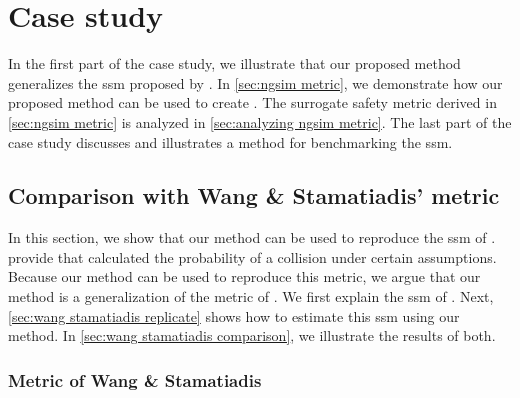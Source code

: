 \section{Case study}
\label{sec:case study}

In the first part of the case study, we illustrate that our proposed method generalizes the \ac{ssm} proposed by \textcite{wang2014evaluation}.
In \cref{sec:ngsim metric}, we demonstrate how our proposed method can be used to create .
The surrogate safety metric derived in \cref{sec:ngsim metric} is analyzed in \cref{sec:analyzing ngsim metric}.
The last part of the case study discusses and illustrates a method for benchmarking the \ac{ssm}.



\subsection{Comparison with Wang \& Stamatiadis' metric}
\label{sec:wang stamatiadis}

In this section, we show that our method can be used to reproduce the \ac{ssm} of \textcite{wang2014evaluation}.
\textcite{wang2014evaluation} provide  that calculated the probability of a collision under certain assumptions. 
Because our method can be used to reproduce this metric, we argue that our method is a generalization of the metric of \textcite{wang2014evaluation}.
We first explain the \ac{ssm} of \textcite{wang2014evaluation}. 
Next, \cref{sec:wang stamatiadis replicate} shows how to estimate this \ac{ssm} using our method.
In \cref{sec:wang stamatiadis comparison}, we illustrate the results of both.



\subsubsection{Metric of Wang \& Stamatiadis}
\label{sec:wang stamatiadis explanation}

